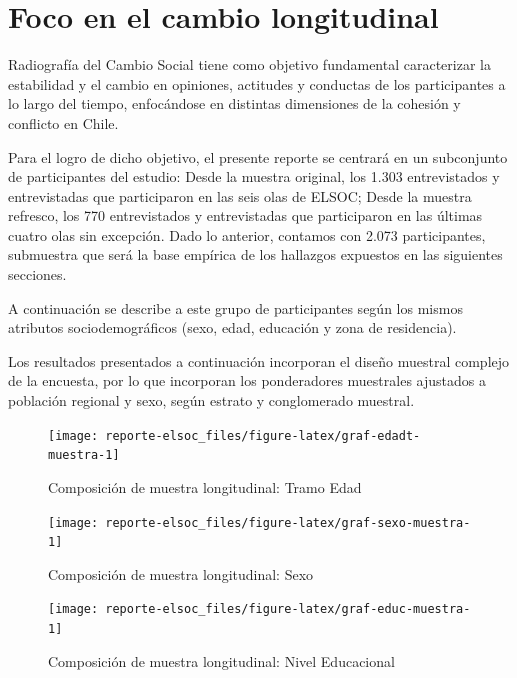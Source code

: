 \documentclass[
  12pt,
]{book}
\begin{document}
\hypertarget{foco-en-el-cambio-longitudinal}{%
\section{Foco en el cambio longitudinal}\label{foco-en-el-cambio-longitudinal}}

Radiografía del Cambio Social tiene como objetivo fundamental caracterizar la estabilidad y el cambio en opiniones, actitudes y conductas de los participantes a lo largo del tiempo, enfocándose en distintas dimensiones de la cohesión y conflicto en Chile.

Para el logro de dicho objetivo, el presente reporte se centrará en un subconjunto de participantes del estudio: Desde la muestra original, los 1.303 entrevistados y entrevistadas que participaron en las seis olas de ELSOC; Desde la muestra refresco, los 770 entrevistados y entrevistadas que participaron en las últimas cuatro olas sin excepción. Dado lo anterior, contamos con 2.073 participantes, submuestra que será la base empírica de los hallazgos expuestos en las siguientes secciones.

A continuación se describe a este grupo de participantes según los mismos atributos sociodemográficos (sexo, edad, educación y zona de residencia).

Los resultados presentados a continuación incorporan el diseño muestral complejo de la encuesta, por lo que incorporan los ponderadores muestrales ajustados a población regional y sexo, según estrato y conglomerado muestral.

\begin{figure}

{\centering \texttt{[image: reporte-elsoc\_files/figure-latex/graf-edadt-muestra-1]} 

}

\caption{Composición de muestra longitudinal: Tramo Edad}\label{fig:graf-edadt-muestra}
\end{figure}

\begin{figure}

{\centering \texttt{[image: reporte-elsoc\_files/figure-latex/graf-sexo-muestra-1]} 

}

\caption{Composición de muestra longitudinal: Sexo}\label{fig:graf-sexo-muestra}
\end{figure}

\begin{figure}

{\centering \texttt{[image: reporte-elsoc\_files/figure-latex/graf-educ-muestra-1]} 

}

\caption{Composición de muestra longitudinal: Nivel Educacional}\label{fig:graf-educ-muestra}
\end{figure}
\end{document}
